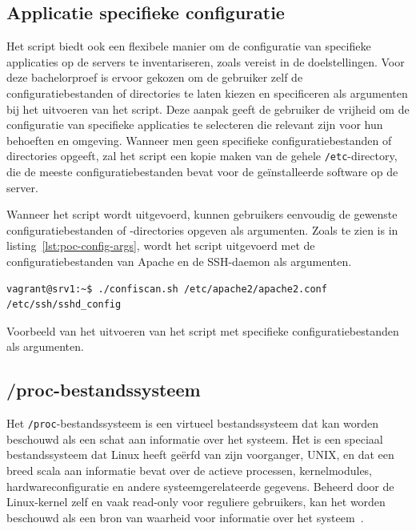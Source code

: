 \subsection{Applicatie specifieke configuratie}
\label{poc_functionaliteiten_app_config}

Het script biedt ook een flexibele manier om de configuratie van specifieke applicaties op de servers te inventariseren, zoals vereist in de doelstellingen.
Voor deze bachelorproef is ervoor gekozen om de gebruiker zelf de configuratiebestanden of directories te laten kiezen en specificeren als argumenten bij het uitvoeren van het script.
Deze aanpak geeft de gebruiker de vrijheid om de configuratie van specifieke applicaties te selecteren die relevant zijn voor hun behoeften en omgeving.
Wanneer men geen specifieke configuratiebestanden of directories opgeeft, zal het script een kopie maken van de gehele \texttt{/etc}-directory, die de meeste configuratiebestanden bevat voor de ge\"installeerde software op de server.

Wanneer het script wordt uitgevoerd, kunnen gebruikers eenvoudig de gewenste configuratiebestanden of -directories opgeven als argumenten.
Zoals te zien is in listing~\ref{lst:poc-config-args}, wordt het script uitgevoerd met de configuratiebestanden van Apache en de SSH-daemon als argumenten.

\begin{listing}
  \begin{verbatim}
vagrant@srv1:~$ ./confiscan.sh /etc/apache2/apache2.conf /etc/ssh/sshd_config
  \end{verbatim}
  \caption[Uitvoeren van script met configuratiebestanden.]{Voorbeeld van het uitvoeren van het script met specifieke configuratiebestanden als argumenten.}
  \label{lst:poc-config-args}
\end{listing}

\subsection{/proc-bestandssysteem}
\label{poc_functionaliteiten_proc}

Het \texttt{/proc}-bestandssysteem is een virtueel bestandssysteem dat kan worden beschouwd als een schat aan informatie over het systeem.
Het is een speciaal bestandssysteem dat Linux heeft ge\"erfd van zijn voorganger, UNIX, en dat een breed scala aan informatie bevat over de actieve processen, kernelmodules, hardwareconfiguratie en andere systeemgerelateerde gegevens.
Beheerd door de Linux-kernel zelf en vaak read-only voor reguliere gebruikers, kan het worden beschouwd als een bron van waarheid voor informatie over het systeem~\autocite{rhel-proc}.

